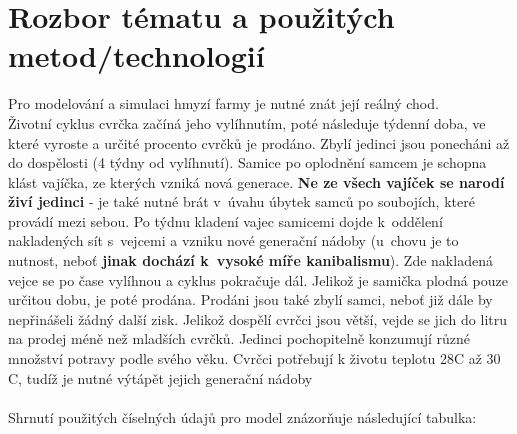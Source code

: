 \documentclass[11pt, a4paper, titlepage]{article}
\begin{document}
    \section{Rozbor tématu a použitých metod/technologií}
    Pro modelování a simulaci hmyzí farmy je nutné znát její reálný chod. \\
    Životní cyklus cvrčka začíná jeho vylíhnutím, poté následuje týdenní doba, ve které vyroste a určité procento cvrčků je prodáno.
    Zbylí jedinci jsou ponecháni až do dospělosti (4 týdny od vylíhnutí).
    Samice po oplodnění samcem je schopna klást vajíčka, ze kterých vzniká nová generace.
    \textbf{Ne ze všech vajíček se narodí živí jedinci} - je také nutné brát v~úvahu úbytek samců po soubojích, které provádí mezi sebou.
    Po týdnu kladení vajec samicemi dojde k~oddělení nakladených sít s~vejcemi a vzniku nové generační nádoby (u~chovu je to nutnost, neboť \textbf{jinak dochází
    k~vysoké míře kanibalismu}). Zde nakladená vejce se po čase vylíhnou a cyklus pokračuje dál. Jelikož je samička plodná pouze určitou dobu,
    je poté prodána. Prodáni jsou také zbylí samci, neboť již dále by nepřinášeli žádný další zisk. Jelikož dospělí cvrčci jsou větší,
    vejde se jich do litru na prodej méně než mladších cvrčků. Jedinci pochopitelně konzumují různé množství potravy podle svého věku. Cvrčci potřebují k
    životu teplotu 28\degree C až 30 \degree C, tudíž je nutné výtápět jejich generační nádoby\\
    \\
    Shrnutí použitých číselných údajů pro model znázorňuje následující tabulka:
\end{document}
